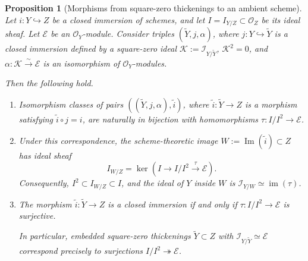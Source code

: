 \documentclass[11pt,twoside]{amsart}
\theoremstyle{plain}
\numberwithin{equation}{section}
\newtheorem{proposition}[theorem]{Proposition}
\theoremstyle{definition}
\begin{document}
\begin{proposition}[Morphisms from square-zero thickenings to an ambient scheme]
\label{prop:square-zero-thickenings-and-morphisms}
Let \(i:Y\hookrightarrow Z\) be a closed immersion of schemes, and let
\(I=I_{Y/Z}\subset \mathcal O_Z\) be its ideal sheaf. Let \(\mathcal E\) be an
\(\mathcal O_Y\)-module. Consider triples \((\widetilde Y,j,\alpha)\), where
\(j:Y\hookrightarrow \widetilde Y\) is a closed immersion defined by a square-zero ideal
\(\mathcal K:=\mathcal I_{Y/\widetilde Y}\), \(\mathcal K^2=0\), and
\(\alpha:\mathcal K\xrightarrow{\sim}\mathcal E\) is an isomorphism of
\(\mathcal O_Y\)-modules.

Then the following hold.

\begin{enumerate}
    \item Isomorphism classes of pairs \(\left((\widetilde Y,j,\alpha),\widetilde i\right)\),
    where \(\widetilde i:\widetilde Y\to Z\) is a morphism satisfying
    \(\widetilde i\circ j=i\), are naturally in bijection with homomorphisms
    \(\tau:I/I^2\to \mathcal E\).

    \item Under this correspondence, the scheme-theoretic image
    \(W:=\operatorname{Im}(\widetilde i)\subset Z\) has ideal sheaf
    \[
        I_{W/Z}
        =
        \ker\left(
            I
            \longrightarrow
            I/I^2
            \xrightarrow{\tau}
            \mathcal E
        \right).
    \]
    Consequently, \(I^2\subset I_{W/Z}\subset I\), and the ideal of \(Y\) inside \(W\) is
    \(\mathcal I_{Y/W}\simeq\operatorname{im}(\tau)\).

    \item The morphism \(\widetilde i:\widetilde Y\to Z\) is a closed immersion if and only
    if \(\tau:I/I^2\to \mathcal E\) is surjective.

    In particular, embedded square-zero thickenings \(\widetilde Y\subset Z\) with
    \(\mathcal I_{Y/\widetilde Y}\simeq\mathcal E\) correspond precisely to surjections
    \(I/I^2\twoheadrightarrow \mathcal E\).
\end{enumerate}
\end{proposition}
\end{document}
